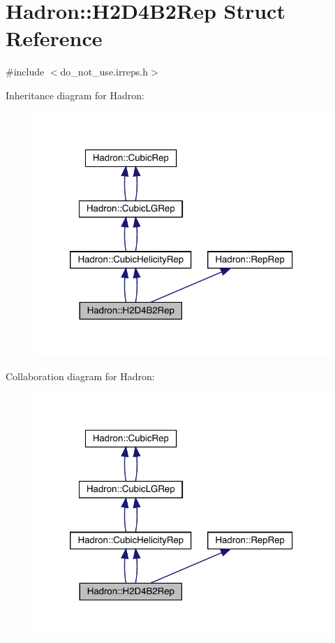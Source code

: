 \hypertarget{structHadron_1_1H2D4B2Rep}{}\section{Hadron\+:\+:H2\+D4\+B2\+Rep Struct Reference}
\label{structHadron_1_1H2D4B2Rep}


{\ttfamily \#include $<$do\+\_\+not\+\_\+use.\+irreps.\+h$>$}



Inheritance diagram for Hadron\+:\nopagebreak
\begin{figure}[H]
\begin{center}
\leavevmode
\includegraphics[width=320pt]{df/dbb/structHadron_1_1H2D4B2Rep__inherit__graph}
\end{center}
\end{figure}


Collaboration diagram for Hadron\+:\nopagebreak
\begin{figure}[H]
\begin{center}
\leavevmode
\includegraphics[width=320pt]{dc/dcf/structHadron_1_1H2D4B2Rep__coll__graph}
\end{center}
\end{figure}
